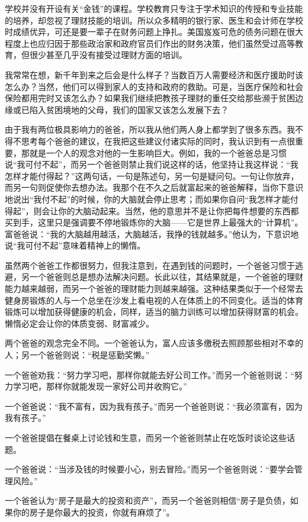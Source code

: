 学校并没有开设有关“金钱”的课程。学校教育只专注于学术知识的传授和专业技能的培养，却忽视了理财技能的培训。所以众多精明的银行家、医生和会计师在学校时成绩优异，可还是要一辈子在财务问题上挣扎。美国岌岌可危的债务问题在很大程度上也应归因于那些政治家和政府官员们作出的财务决策，他们虽然受过高等教育，但很少甚至几乎没有接受过理财方面的培训。

我常常在想，新千年到来之后会是什么样子？当数百万人需要经济和医疗援助时该怎么办？当然，他们可以得到家人的支持和政府的救助。可是，当医疗保险和社会保险都用完时又该怎么办？如果我们继续把教孩子理财的重任交给那些濒于贫困边缘或已陷入贫困境地的父母，我们的国家又该怎么发展下去？

由于我有两位极具影响力的爸爸，所以我从他们两人身上都学到了很多东西。我不得不思考每个爸爸的建议，在我把这些建议付诸实际的同时，我认识到有一点很重要，那就是一个人的观念对他的一生影响巨大。例如，我的一个爸爸总是习惯说“我可付不起”，而另一个爸爸则禁止我们说这样的话，他坚持让我这样说：“我怎样才能付得起？”这两句话，一句是陈述句，另一句是疑问句。一句让你放弃，而另一句则促使你去想办法。我那个在不久之后就富起来的爸爸解释，当你下意识地说出“我付不起”的时候，你的大脑就会停止思考；而如果你自问“我怎样才能付得起”，则会让你的大脑动起来。当然，他的意思并不是让你把每件想要的东西都买到手，这里只是强调要不停地锻炼你的大脑——它是世界上最强大的“计算机”。富爸爸说：“我的大脑越用越活，大脑越活，我挣的钱就越多。”他认为，下意识地说“我可付不起”意味着精神上的懒惰。

虽然两个爸爸工作都很努力，但我注意到，在遇到钱的问题时，一个爸爸习惯于逃避，另一个爸爸则总是想办法解决问题。长此以往，其结果就是，一个爸爸的理财能力越来越弱，而另一个爸爸的理财能力则越来越强。这种结果类似于一个经常去健身房锻炼的人与一个总坐在沙发上看电视的人在体质上的不同变化。适当的体育锻炼可以增加获得健康的机会，同样，适当的脑力训练可以增加获得财富的机会。懒惰必定会让你的体质变弱、财富减少。

两个爸爸的观念完全不同。一个爸爸认为，富人应该多缴税去照顾那些相对不幸的人；另一个爸爸则说：“税是惩勤奖懒。”

一个爸爸劝我：“努力学习吧，那样你就能去好公司工作。”而另一个爸爸则说：“努力学习吧，那样你就能发现一家好公司并收购它。”

一个爸爸说：“我不富有，因为我有孩子。”而另一个爸爸则说：“我必须富有，因为我有孩子。”

一个爸爸提倡在餐桌上讨论钱和生意，而另一个爸爸则禁止在吃饭时谈论这些话题。

一个爸爸说：“当涉及钱的时候要小心，别去冒险。”而另一个爸爸则说：“要学会管理风险。”

一个爸爸认为“房子是最大的投资和资产”，而另一个爸爸则相信“房子是负债，如果你的房子是你最大的投资，你就有麻烦了”。

